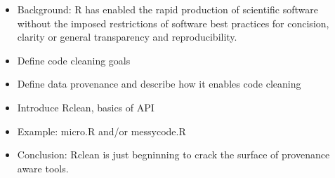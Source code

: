 
\begin{itemize}
\item Background: R has enabled the rapid production of scientific
  software without the imposed restrictions of software best practices
  for concision, clarity or general transparency and reproducibility.
\item Define code cleaning goals
\item Define data provenance and describe how it enables code cleaning
\item Introduce Rclean, basics of API
\item Example: micro.R and/or messycode.R
\item Conclusion: Rclean is just begninning to crack the surface of
  provenance aware tools.
\end{itemize}
